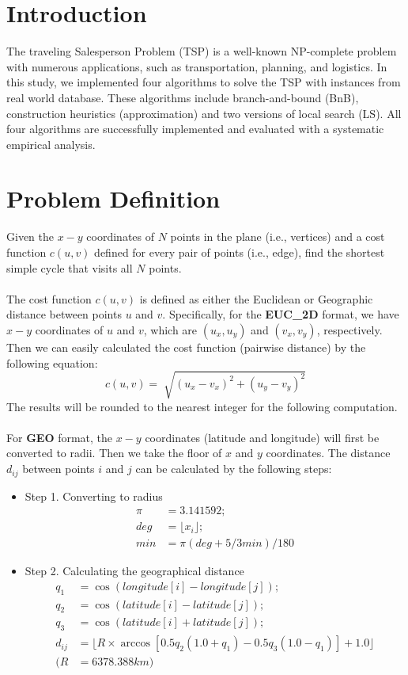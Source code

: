 \section{Introduction}
The traveling Salesperson Problem (TSP) is a well-known NP-complete problem with numerous applications, such as transportation, planning, and logistics. In this study, we implemented four algorithms to solve the TSP with instances from real world database. These algorithms include branch-and-bound (BnB), construction heuristics (approximation) and two versions of local search (LS). All four algorithms are successfully implemented and evaluated with a systematic empirical analysis. 

\section{Problem Definition}
Given the $x-y$ coordinates of $N$ points in the plane (i.e., vertices) and a cost function $c(u,v)$ defined for every pair of points (i.e., edge), find the shortest simple cycle that visits all $N$ points.\\
\\
The cost function $c(u,v)$ is defined as either the Euclidean or Geographic distance between points $u$ and $v$. Specifically, for the \textbf{EUC\_2D} format, we have $x-y$ coordinates of $u$ and $v$, which are $(u_x, u_y)$ and $(v_x, v_y)$, respectively. Then we can easily calculated the cost function (pairwise distance) by the following equation:
\begin{equation}
  c(u,v)=\sqrt[]{(u_x-v_x)^2 + (u_y-v_y)^2}
\end{equation}
The results will be rounded to the nearest integer for the following computation.\\
\\
For \textbf{GEO} format, the $x-y$ coordinates (latitude and longitude) will first be converted to radii. Then we take the floor of $x$ and $y$ coordinates. The distance $d_{ij}$ between points $i$ and $j$ can be calculated by the following steps:
\begin{itemize}
\item Step 1. Converting to radius
\begin{align*}
\pi &= 3.141592;\\
deg &= \lfloor x_i\rfloor;\\
min &= \pi (deg+5/3 min)/180
\end{align*} 
\item Step 2. Calculating the geographical distance
\begin{align*}
q_1 &= \cos(longitude[i]-longitude[j]);\\
q_2 &= \cos(latitude[i]-latitude[j]);\\
q_3 &= \cos(latitude[i]+latitude[j]);\\
d_{ij}&=\lfloor R \times \arccos[0.5q_2(1.0+q_1) - 0.5q_3(1.0-q_1)]+1.0\rfloor \\
(R &= 6378.388 km) 
\end{align*}
\end{itemize}
